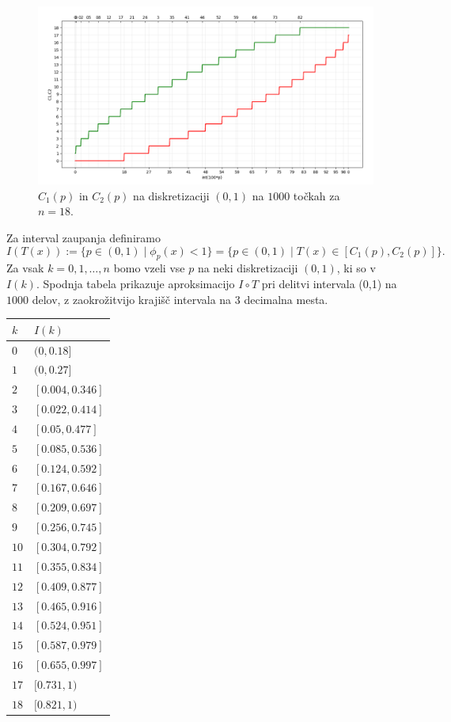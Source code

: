 \documentclass[ letterpaper, titlepage, fleqn]{article}
\begin{document}
\begin{center}
\begin{figure}[h]
\begin{center}
\includegraphics[width=15cm]{graphics/C1C2_18.png}
\caption{$C_1(p)$ in $C_2(p)$  na diskretizaciji $(0,1)$ na $1000$ točkah za $n=18$.}
\end{center}
\end{figure}
\end{center}

Za interval zaupanja definiramo
$$I(T(x)) := \{p \in (0,1) \mid \phi_p(x) < 1\} = \{p \in (0,1) \mid T(x) \in [C_1(p), C_2(p)]\}.$$
Za vsak $k=0,1,\dots,n$ bomo vzeli vse $p$ na neki diskretizaciji $(0,1)$, ki so v $I(k)$. Spodnja tabela prikazuje aproksimacijo $I\circ T$ pri delitvi intervala (0,1) na $1000$ delov, z zaokrožitvijo krajišč intervala na $3$ decimalna mesta.
\begin{center}
\begin{tabular}{ |l|l| }
\hline
$k$ & $I(k)$ \\
\hline
$0$ & $ (0, 0.18]$ \\
$1$ & $(0, 0.27]$ \\
$2$ & $[0.004, 0.346]$ \\
$3$ & $[0.022, 0.414]$ \\
$4$ & $[0.05, 0.477]$ \\
$5$ & $[0.085, 0.536]$ \\
$6$ & $[0.124, 0.592]$ \\
$7$ & $[0.167, 0.646]$ \\
$8$ & $[0.209, 0.697]$ \\
$9$ & $[0.256, 0.745]$ \\
$10$ & $[0.304, 0.792]$ \\
$11$ & $[0.355, 0.834]$ \\
$12$ & $[0.409, 0.877]$ \\
$13$ & $[0.465, 0.916]$ \\
$14$ & $[0.524, 0.951]$ \\
$15$ & $[0.587, 0.979]$ \\
$16$ & $[0.655, 0.997]$ \\
$17$ & $[0.731, 1)$ \\
$18$ & $[0.821, 1)$ \\
\hline
\end{tabular}
\end{center}
\end{document}
